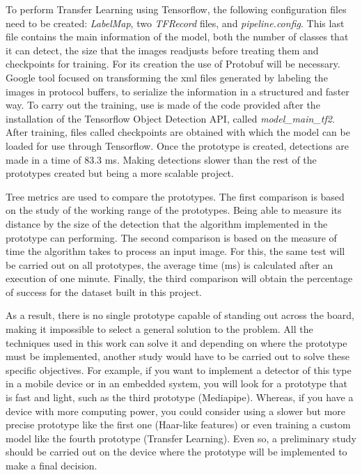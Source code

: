 \vspace{-0.3cm}
To perform Transfer Learning using Tensorflow, the following configuration files need to be created: \textit{LabelMap}, two \textit{TFRecord} files, and \textit{pipeline.config}. This last file contains the main information of the model, both the number of classes that it can detect, the size that the images readjusts before treating them and checkpoints for training. For its creation the use of Protobuf will be necessary. Google tool focused on transforming the xml files generated by labeling the images in protocol buffers, to serialize the information in a structured and faster way. To carry out the training, use is made of the code provided after the installation of the Tensorflow Object Detection API, called \textit{model\_main\_tf2}. After training, files called checkpoints are obtained with which the model can be loaded for use through Tensorflow. Once the prototype is created, detections are made in a time of 83.3 ms. Making detections slower than the rest of the prototypes created but being a more scalable project.

\vspace{-0.3cm}
Tree metrics are used to compare the prototypes. The first comparison is based on the study of the working range of the prototypes. Being able to measure its distance by the size of the detection that the algorithm implemented in the prototype can performing. The second comparison is based on the measure of time the algorithm takes to process an input image. For this, the same test will be carried out on all prototypes, the average time (ms) is calculated after an execution of one minute. Finally, the third comparison will obtain the percentage of success for the dataset built in this project.

\vspace{-0.3cm}
As a result, there is no single prototype capable of standing out across the board, making it impossible to select a general solution to the problem. All the techniques used in this work can solve it and depending on where the prototype must be implemented, another study would have to be carried out to solve these specific objectives. For example, if you want to implement a detector of this type in a mobile device or in an embedded system, you will look for a prototype that is fast and light, such as the third prototype (Mediapipe). Whereas, if you have a device with more computing power, you could consider using a slower but more precise prototype like the first one (Haar-like features) or even training a custom model like the fourth prototype (Transfer Learning). Even so, a preliminary study should be carried out on the device where the prototype will be implemented to make a final decision.


